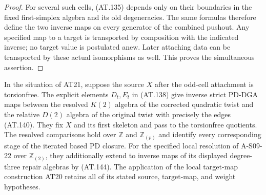 \begin{proof}
For several such cells, (AT.135) depends only on their
boundaries in the fixed first-simplex algebra and its
old degeneracies. The same formulas therefore define
the two inverse maps on every generator of the combined
pushout. Any specified map to a target is transported
by composition with the indicated inverse; no target
value is postulated anew. Later attaching data can be
transported by these actual isomorphisms as well.
This proves the simultaneous assertion.
\end{proof}
\begin{proposition}
\label{AT21b}
In the situation of AT21, suppose the source $X$ after
the odd-cell attachment is torsionfree. The explicit
elements $D_t,E_t$ in (AT.138) give inverse strict
PD-DGA maps between the resolved $K(2)$ algebra of the
corrected quadratic twist and the relative $D(2)$ algebra
of the original twist with precisely the edges (AT.140).
They fix $X$ and its first skeleton and pass to the
torsionfree quotients.
The resolved comparisons hold over $\mathbb Z$ and
$\mathbb Z_{(p)}$ and identify every corresponding stage
of the iterated based PD closure.
For the specified local resolution of A-S09-22 over
$\mathbb Z_{(2)}$, they additionally extend to inverse
maps of its displayed degree-three repair algebras
by (AT.144).
The application of the local target-map
construction AT20 retains all of its stated source,
target-map, and weight hypotheses.
\end{proposition}

